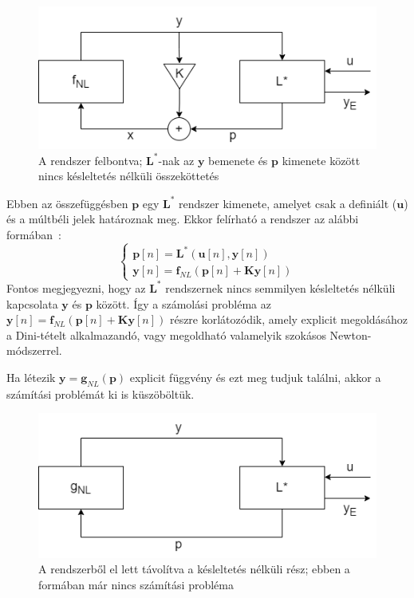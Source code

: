 \begin{figure}[H]
    \centering
    \includegraphics[scale=0.5]{figures/pxy.png}
    \caption{A rendszer felbontva; $\mathbf{L^*}$-nak az $\mathbf{y}$ bemenete és $\mathbf{p}$ kimenete között nincs késleltetés nélküli 
    összeköttetés}
\end{figure}
Ebben az összefüggésben $\mathbf{p}$ egy $\mathbf{L^*}$ rendszer kimenete, amelyet csak a definiált ($\mathbf{u}$) és a múltbéli jelek határoznak meg. 
Ekkor felírható a rendszer az alábbi formában~\cite{borin}:
\begin{equation}
    \begin{cases}
        \mathbf{p}[n]=\mathbf{L^*}(\mathbf{u}[n],\mathbf{y}[n]) \\
        \mathbf{y}[n]=\mathbf{f}_{NL}(\mathbf{p}[n]+\mathbf{Ky}[n])
    \end{cases}
\end{equation}
Fontos megjegyezni, hogy az $\mathbf{L^*}$ rendszernek nincs semmilyen késleltetés nélküli kapcsolata $\mathbf{y}$ és $\mathbf{p}$ között. 
Így a számolási probléma az $\mathbf{y}[n]=\mathbf{f}_{NL}(\mathbf{p}[n]+\mathbf{Ky}[n])$ részre korlátozódik, amely explicit megoldásához a Dini-tételt alkalmazandó, 
vagy megoldható valamelyik szokásos Newton-módszerrel.

Ha létezik $\mathbf{y}=\mathbf{g}_{NL}(\mathbf{p})$ explicit függvény és ezt meg tudjuk találni, akkor a számítási problémát ki is 
küszöböltük.

\begin{figure}[H]
    \centering
    \includegraphics[scale=0.5]{figures/py.png}
    \caption{A rendszerből el lett távolítva a késleltetés nélküli rész; ebben a formában már nincs számítási probléma}
\end{figure}

